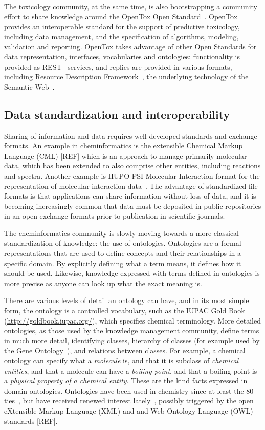 \documentclass[11pt]{book}
\begin{document}
The toxicology community, at the same time, is also bootstrapping
a community effort to share knowledge around the OpenTox Open Standard~\cite{Hardy2010}.
OpenTox provides an interoperable standard for the support of predictive toxicology,
including data management, and the specification of algorithms, modeling, validation and
reporting. OpenTox takes advantage of other Open Standards for data representation,
interfaces, vocabularies and ontologies: functionality is provided as REST~\cite{fielding:2000} services,
and replies are provided in various formats, including Resource Description
Framework~\cite{Carroll:04:RDF},
the underlying technology of the Semantic Web~\cite{BernersLee2001}.

\subsection{Data standardization and interoperability}

Sharing of information and data requires well developed standards and exchange formats.
An example in cheminformatics is the extensible Chemical Markup Language (CML) [REF] which
is an approach to manage primarily molecular data, which has been extended to also
comprise other entities, including reactions and spectra. Another example is HUPO-PSI
Molecular Interaction format for the representation of molecular interaction
data~\cite{Orchard:2010uq}. The advantage of standardized file formats is that
applications can share information without loss of data, and it is becoming
increasingly common that data must be deposited in public repositories in an
open exchange formats prior to publication in scientific journals.

The cheminformatics community is slowly moving towards a more classical
standardization of knowledge: the use of ontologies. Ontologies are a formal
representations that are used to define concepts and their relationships in a
specific domain. By explicitly defining what a term means, it defines how
it should be used. Likewise, knowledge expressed with terms defined in
ontologies is more precise as anyone can look up what the exact meaning is.

There are various levels of detail an ontology can have, and in its most
simple form, the ontology is a controlled vocabulary, such as the IUPAC
Gold Book (\url{http://goldbook.iupac.org/}), which specifies chemical terminology.
More detailed ontologies, as those used by the knowledge management community,
define terms in much more detail, identifying classes, hierarchy of classes
(for example used by the Gene Ontology~\cite{GO2008,GO2010}), and relations
between classes. For example, a chemical ontology can specify what a \textit{molecule}
is, and that it is subclass of \textit{chemical entities}, and that a molecule can have
a \textit{boiling point}, and that a boiling point is a \textit{physical property of a chemical
entity}. These are the kind facts expressed in domain ontologies.
Ontologies have been used in chemistry since at least the 80-ties~\cite{Gordon1983},
but have received renewed interest lately~\cite{Feldman2005,Dumontier2009,Sankar2010}, possibly triggered by the
open eXtensible Markup Language (XML) and and Web Ontology Language (OWL)
standards [REF].
\end{document}
